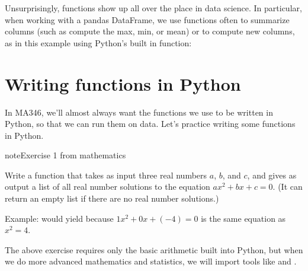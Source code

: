 \documentclass[letterpaper,10pt,english]{sphinxmanual}
\begin{document}
Unsurprisingly, functions show up all over the place in data science.  In particular, when working with a pandas DataFrame, we use functions often to summarize columns (such as compute the max, min, or mean) or to compute new columns, as in this example using Python’s built in \sphinxcode{\sphinxupquote{/}} function:

\begin{sphinxVerbatim}[commandchars=\\\{\}]
\PYG{p}{[}\PYG{p}{]}  \PYG{p}{[}\PYG{p}{]}  \PYG{p}{[}\PYG{p}{]}
\end{sphinxVerbatim}


\section{Writing functions in Python}
\label{\detokenize{chapter-2-mathematical-foundations:writing-functions-in-python}}
In MA346, we’ll almost always want the functions we use to be written in Python, so that we can run them on data.  Let’s practice writing some functions in Python.

\begin{sphinxadmonition}{note}{Exercise 1 \sphinxhyphen{} from mathematics}

Write a function  that takes as input three real numbers \(a\), \(b\), and \(c\), and gives as output a list of all real number solutions to the equation \(ax^2+bx+c=0\).  (It can return an empty list if there are no real number solutions.)

Example:  would yield \sphinxcode{\sphinxupquote{{[}\sphinxhyphen{}2,2{]}}} because \(1x^2+0x+(-4)=0\) is the same equation as \(x^2=4\).
\end{sphinxadmonition}

The above exercise requires only the basic arithmetic built into Python, but when we do more advanced mathematics and statistics, we will import tools like  and .
\end{document}
